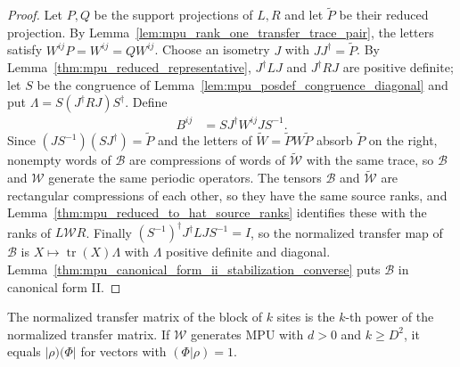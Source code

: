 \begin{proof}\leanok
    Let $P,Q$ be the support projections of $L,R$ and let $\widetilde P$ be
    their reduced projection. By
    Lemma~\ref{lem:mpu_rank_one_transfer_trace_pair}, the letters satisfy
    $W^{ij}P=W^{ij}=QW^{ij}$. Choose an isometry $J$ with
    $JJ^\dagger=\widetilde P$. By
    Lemma~\ref{thm:mpu_reduced_representative}, $J^\dagger LJ$ and
    $J^\dagger RJ$ are positive definite; let $S$ be the congruence of
    Lemma~\ref{lem:mpu_posdef_congruence_diagonal} and put
    $\Lambda=S(J^\dagger RJ)S^\dagger$. Define
    \begin{align}
        B^{ij} & =SJ^\dagger W^{ij}JS^{-1}.
    \end{align}
    Since $(JS^{-1})(SJ^\dagger)=\widetilde P$ and the letters of
    $\widetilde W=\widetilde PW\widetilde P$ absorb $\widetilde P$ on the
    right, nonempty words of $\mathcal B$ are compressions of words of
    $\widetilde{\mathcal W}$ with the same trace, so $\mathcal B$ and
    $\mathcal W$ generate the same periodic operators. The tensors
    $\mathcal B$ and $\widetilde{\mathcal W}$ are rectangular compressions of
    each other, so they have the same source ranks, and
    Lemma~\ref{thm:mpu_reduced_to_hat_source_ranks} identifies these with the
    ranks of $L\mathcal WR$. Finally
    $(S^{-1})^\dagger J^\dagger LJS^{-1}=I$, so the normalized transfer map of
    $\mathcal B$ is $X\mapsto\operatorname{tr}(X)\Lambda$ with $\Lambda$
    positive definite and diagonal. Lemma~\ref{thm:mpu_canonical_form_ii_stabilization_converse}
    puts $\mathcal B$ in canonical form II.
\end{proof}

\begin{lemma}
    \label{lem:mpu_blocked_transfer_rank_one}
    \leanok
    The normalized transfer matrix of the block of $k$ sites is the $k$-th
    power of the normalized transfer matrix. If $\mathcal W$ generates MPU
    with $d>0$ and $k\geq D^2$, it equals $|\rho)(\Phi|$ for vectors with
    $(\Phi|\rho)=1$.
\end{lemma}

